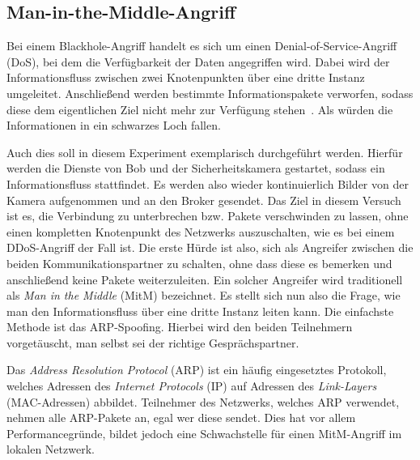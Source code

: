 \subsection{Man-in-the-Middle-Angriff}
Bei einem Blackhole-Angriff handelt es sich um einen Denial-of-Service-Angriff
(DoS), bei dem die Verfügbarkeit der Daten angegriffen wird. Dabei wird der
Informationsfluss zwischen zwei Knotenpunkten über eine dritte Instanz
umgeleitet. Anschließend werden bestimmte Informationspakete verworfen, sodass
diese dem eigentlichen Ziel nicht mehr zur Verfügung stehen~\cite{aad2004}. Als
würden die Informationen in ein schwarzes Loch fallen.

Auch dies soll in diesem Experiment exemplarisch durchgeführt werden. Hierfür
werden die Dienste von Bob und der Sicherheitskamera gestartet, sodass ein
Informationsfluss stattfindet. Es werden also wieder kontinuierlich Bilder von
der Kamera aufgenommen und an den Broker gesendet. Das Ziel in diesem Versuch
ist es, die Verbindung zu unterbrechen bzw. Pakete verschwinden zu lassen, ohne
einen kompletten Knotenpunkt des Netzwerks auszuschalten, wie es bei einem
DDoS-Angriff der Fall ist. Die erste Hürde ist also, sich als Angreifer zwischen
die beiden Kommunikationspartner zu schalten, ohne dass diese es bemerken und
anschließend keine Pakete weiterzuleiten. Ein solcher Angreifer wird traditionell
als \textit{Man in the Middle} (MitM) bezeichnet. Es stellt sich nun also die
Frage, wie man den Informationsfluss über eine dritte Instanz leiten kann. Die
einfachste Methode ist das ARP-Spoofing. Hierbei wird den beiden Teilnehmern
vorgetäuscht, man selbst sei der richtige Gesprächspartner.

Das \textit{Address Resolution Protocol} (ARP) ist ein häufig eingesetztes
Protokoll, welches Adressen des \textit{Internet Protocols} (IP) auf Adressen
des \textit{Link-Layers} (MAC-Adressen) abbildet. Teilnehmer des Netzwerks,
welches ARP verwendet, nehmen alle ARP-Pakete an, egal wer diese sendet. Dies
hat vor allem Performancegründe, bildet jedoch eine Schwachstelle für einen
MitM-Angriff im lokalen Netzwerk.

